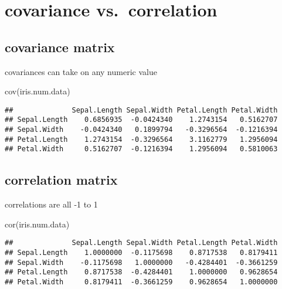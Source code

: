 \documentclass[
]{book}
\newenvironment{Shaded}{\begin{snugshade}}{\end{snugshade}}
\newcommand{\FunctionTok}[1]{\textcolor[rgb]{0.00,0.00,0.00}{#1}}
\newcommand{\NormalTok}[1]{#1}
\begin{document}
\hypertarget{covariance-vs.-correlation}{%
\section{covariance vs.~correlation}\label{covariance-vs.-correlation}}

\hypertarget{covariance-matrix}{%
\subsection{covariance matrix}\label{covariance-matrix}}

covariances can take on any numeric value

\begin{Shaded}
\begin{Highlighting}[]
\FunctionTok{cov}\NormalTok{(iris.num.data)}
\end{Highlighting}
\end{Shaded}

\begin{verbatim}
##              Sepal.Length Sepal.Width Petal.Length Petal.Width
## Sepal.Length    0.6856935  -0.0424340    1.2743154   0.5162707
## Sepal.Width    -0.0424340   0.1899794   -0.3296564  -0.1216394
## Petal.Length    1.2743154  -0.3296564    3.1162779   1.2956094
## Petal.Width     0.5162707  -0.1216394    1.2956094   0.5810063
\end{verbatim}

\hypertarget{correlation-matrix}{%
\subsection{correlation matrix}\label{correlation-matrix}}

correlations are all -1 to 1

\begin{Shaded}
\begin{Highlighting}[]
\FunctionTok{cor}\NormalTok{(iris.num.data)}
\end{Highlighting}
\end{Shaded}

\begin{verbatim}
##              Sepal.Length Sepal.Width Petal.Length Petal.Width
## Sepal.Length    1.0000000  -0.1175698    0.8717538   0.8179411
## Sepal.Width    -0.1175698   1.0000000   -0.4284401  -0.3661259
## Petal.Length    0.8717538  -0.4284401    1.0000000   0.9628654
## Petal.Width     0.8179411  -0.3661259    0.9628654   1.0000000
\end{verbatim}
\end{document}
